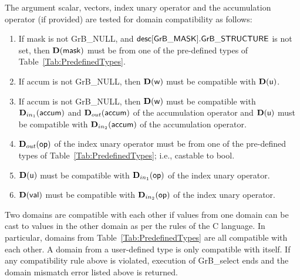 {\color{red}
The argument scalar, vectors, index unary operator and the accumulation 
operator (if provided) are tested for domain compatibility as follows:
\begin{enumerate}
    \item If {\sf mask} is not {\sf GrB\_NULL}, and ${\sf desc[GrB\_MASK].GrB\_STRUCTURE}$
    is not set, then $\bold{D}({\sf mask})$ must be from one of the pre-defined types of 
    Table~\ref{Tab:PredefinedTypes}.

    \item If {\sf accum} is not {\sf GrB\_NULL}, then $\bold{D}({\sf w})$ must be 
	compatible with $\bold{D}({\sf u})$.

    \item If {\sf accum} is not {\sf GrB\_NULL}, then $\bold{D}({\sf w})$ must be
    compatible with $\mbox{$\mathbf{D}_{in_{1}}$}({\sf accum})$ and $\mbox{$\mathbf{D}_{out}$}({\sf accum})$ of the accumulation operator and 
    $\bold{D}({\sf u})$ must be compatible with $\mbox{$\mathbf{D}_{in_{2}}$}({\sf accum})$ of the accumulation operator.

	\item $\mbox{$\mathbf{D}_{out}$}({\sf op})$ of the index unary operator must be from one of the pre-defined types of 
    Table~\ref{Tab:PredefinedTypes}; i.e., castable to {\sf bool}.

    \item $\bold{D}({\sf u})$ must be compatible with $\mbox{$\mathbf{D}_{in_{1}}$}({\sf op})$ of the index unary operator.
    
    \item $\bold{D}({\sf val})$ must be compatible with $\mbox{$\mathbf{D}_{in_{2}}$}({\sf op})$ of the index unary operator.
\end{enumerate}
}
Two domains are compatible with each other if values from one domain can be cast 
to values in the other domain as per the rules of the C language.
In particular, domains from Table~\ref{Tab:PredefinedTypes} are all compatible 
with each other. A domain from a user-defined type is only compatible with itself.
If any compatibility rule above is violated, execution of {\sf GrB\_select} ends
and the domain mismatch error listed above is returned.

